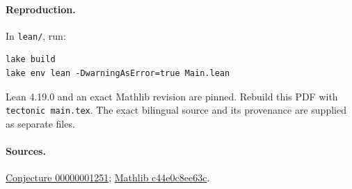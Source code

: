 \documentclass[11pt]{article}
\begin{document}
\paragraph{Reproduction.}
In \texttt{lean/}, run:
\begin{verbatim}
lake build
lake env lean -DwarningAsError=true Main.lean
\end{verbatim}
Lean 4.19.0 and an exact Mathlib revision are pinned. Rebuild this PDF with
\texttt{tectonic main.tex}. The exact bilingual source and its provenance
are supplied as separate files.

\paragraph{Sources.}
\href{https://github.com/The-Last-Math-Competition/The-Last-Math-Competition/blob/9b795e7a94a6076e49a65a6489e1caf9153abd23/conjectures/00000001251.md}{Conjecture 00000001251};
\href{https://github.com/leanprover-community/mathlib4/commit/c44e0c8ee63ca166450922a373c7409c5d26b00b}{Mathlib c44e0c8ee63c}.
\end{document}
